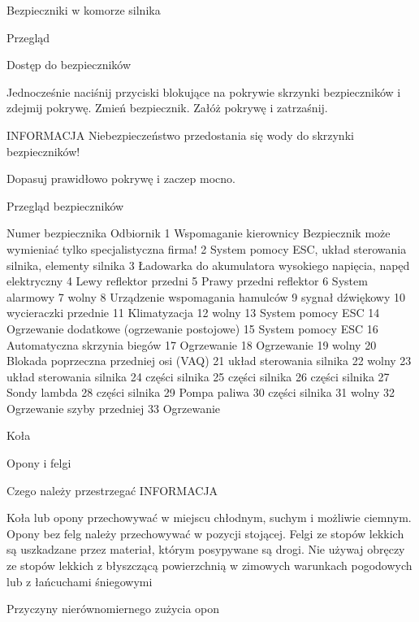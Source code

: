 Bezpieczniki w komorze silnika

Przegląd

Dostęp do bezpieczników


\begin{itemizeArrow}
	\itemArrow Jednocześnie naciśnij przyciski blokujące na pokrywie skrzynki bezpieczników i zdejmij pokrywę.
	\itemArrow Zmień bezpiecznik.
	\itemArrow Załóż pokrywę i zatrzaśnij.
\end{itemizeArrow}

INFORMACJA
Niebezpieczeństwo przedostania się wody do skrzynki bezpieczników!
\begin{itemizeTriangle}
	\itemTriangle Dopasuj prawidłowo pokrywę i zaczep mocno.
\end{itemizeTriangle}

Przegląd bezpieczników


Numer bezpiecznika	Odbiornik
1	Wspomaganie kierownicy
Bezpiecznik może wymieniać tylko specjalistyczna firma!
2	System pomocy ESC, układ sterowania silnika, elementy silnika
3	Ładowarka do akumulatora wysokiego napięcia, napęd elektryczny
4 Lewy reflektor przedni
5 Prawy przedni reflektor
6 System alarmowy
7 wolny
8 Urządzenie wspomagania hamulców
9 sygnał dźwiękowy
10 wycieraczki przednie
11 Klimatyzacja
12 wolny
13 System pomocy ESC
14 Ogrzewanie dodatkowe (ogrzewanie postojowe)
15 System pomocy ESC
16 Automatyczna skrzynia biegów
17 Ogrzewanie
18 Ogrzewanie
19 wolny
20 Blokada poprzeczna przedniej osi (VAQ)
21 układ sterowania silnika
22 wolny
23 układ sterowania silnika
24 części silnika
25 części silnika
26 części silnika
27 Sondy lambda
28 części silnika
29 Pompa paliwa
30 części silnika
31 wolny
32 Ogrzewanie szyby przedniej
33 Ogrzewanie

Koła

Opony i felgi

Czego należy przestrzegać
INFORMACJA
\begin{itemizeTriangle}
	\itemTriangle Koła lub opony przechowywać w miejscu chłodnym, suchym i możliwie ciemnym. Opony bez felg należy przechowywać w pozycji stojącej.
	\itemTriangle Felgi ze stopów lekkich są uszkadzane przez materiał, którym posypywane są drogi.
	\itemTriangle Nie używaj obręczy ze stopów lekkich z błyszczącą powierzchnią w zimowych warunkach pogodowych lub z łańcuchami śniegowymi
\end{itemizeTriangle}

Przyczyny nierównomiernego zużycia opon

